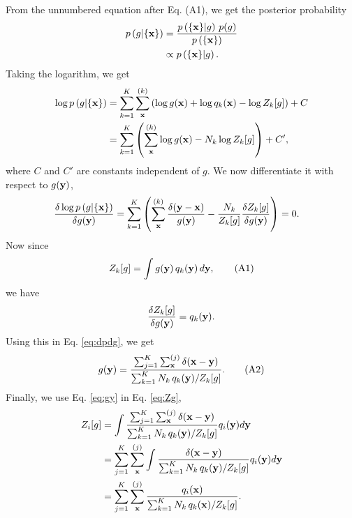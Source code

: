 \documentclass[aip,jcp,preprint,notitlepage, superscriptaddress]{revtex4-1}
\begin{document}
From the unnumbered equation after Eq. (A1),
we get the posterior probability
\begin{align*}
p\left( g | \{ \mathbf{x} \} \right)
&=
\frac{
  p\left( \{ \mathbf{x} \} | g \right) \, p(g)
}
{
  p\left( \{ \mathbf{x} \} \right)
}
\\
&\propto
p\left( \{ \mathbf{x} \} | g \right).
\end{align*}
%
Taking the logarithm, we get
%
\begin{align*}
\log p\left( g | \{ \mathbf{x} \} \right)
&=
\sum_{k = 1}^K
  \sum_{\mathbf{x}}^{(k)}
    \left(
      \log g(\mathbf{x}) + \log q_k(\mathbf{x}) - \log Z_k[g]
    \right)
+ C
\\
&=
\sum_{k = 1}^K
\left(
  \sum_{\mathbf{x}}^{(k)}
    \log g(\mathbf{x}) - N_k \log Z_k[g]
\right) + C',
\end{align*}
%
where $C$ and $C'$
are constants independent of $g$.
%
We now differentiate it with respect to $g(\mathbf{y})$,
%
\begin{align}
\frac{
  \delta \log p\left( g | \{ \mathbf{x} \} \right)
}
{
  \delta g(\mathbf{y})
}
&=
\sum_{k = 1}^K
\left(
  \sum_{\mathbf{x}}^{(k)}
  \frac{ \delta( \mathbf{y} - \mathbf{x} ) }
  { g(\mathbf{y}) }
  -
  \frac {N_k} { Z_k[g] }
  \frac{ \delta Z_k[g] } { \delta g(\mathbf{y}) }
\right)
= 0.
\label{eq:dpdg}
\end{align}
%
Now since
\begin{equation}
Z_k[g]
=
\int g(\mathbf{y}) \, q_k(\mathbf{y}) \, d\mathbf{y},
\tag{A1}
\label{eq:Zg}
\end{equation}
we have
\begin{equation*}
\frac{ \delta Z_k[g] } { \delta g(\mathbf{y}) }
= q_k(\mathbf{y}).
\end{equation*}
%
Using this in Eq. \eqref{eq:dpdg},
we get
\begin{equation}
g(\mathbf{y})
=
\frac{
  \sum_{j = 1}^K \sum_{\mathbf{x}}^{(j)} \delta(\mathbf{x} - \mathbf{y})
}
{
  \sum_{k = 1}^K N_k \, q_k(\mathbf{y}) / Z_k[g]
}.
\tag{A2}
\label{eq:gy}
\end{equation}
%
Finally,
we use Eq. \eqref{eq:gy} in Eq. \eqref{eq:Zg},
%
\begin{align}
Z_i[g]
&=
\int
\frac{
  \sum_{j = 1}^K \sum_{\mathbf{x}}^{(j)} \delta(\mathbf{x} - \mathbf{y})
}
{
  \sum_{k = 1}^K N_k \, q_k(\mathbf{y}) / Z_k[g]
}
q_i(\mathbf{y}) d\mathbf{y}
\notag \\
&=
\sum_{j = 1}^K \sum_{\mathbf{x}}^{(j)}
\int
\frac{
  \delta(\mathbf{x} - \mathbf{y})
}
{
  \sum_{k = 1}^K N_k \, q_k(\mathbf{y}) / Z_k[g]
}
q_i(\mathbf{y}) d\mathbf{y}
\notag \\
&=
\sum_{j = 1}^K \sum_{\mathbf{x}}^{(j)}
\frac{
  q_i(\mathbf{x})
}
{
  \sum_{k = 1}^K N_k \, q_k(\mathbf{x}) / Z_k[g]
}.
\end{align}
\end{document}
